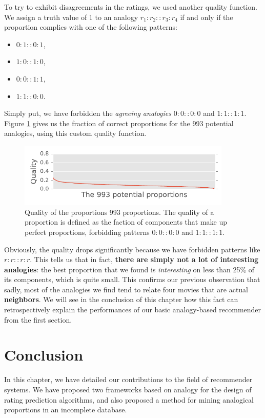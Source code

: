 To try to exhibit disagreements in the ratings, we used another quality
function. We assign a truth value of $1$ to an analogy $r_1:r_2::r_3:r_4$ if
and only if the proportion complies with one of the following patterns:
\begin{itemize}
  \item $0:1::0:1$,
  \item $1:0::1:0$,
  \item $0:0::1:1$,
  \item $1:1::0:0$.
\end{itemize}
Simply put, we have forbidden the \textit{agreeing analogies} $0:0::0:0$ and
$1:1::1:1$. Figure \ref{FIG:quality_proportions_different_ab_cd} gives us the
fraction of correct proportions for the 993 potential analogies, using this
custom quality function.
\begin{figure}[!h]
\centering
  \includegraphics[width=4in]{figures/quality_of_proportions_different.pdf}
  \caption{Quality of the proportions 993 proportions. The quality of a
  proportion is defined as the faction of components that make up perfect
  proportions, forbidding patterns $0:0::0:0$ and $1:1::1:1$.}
\label{FIG:quality_proportions_different_ab_cd}
\end{figure}
Obviously, the quality drops significantly because we have forbidden patterns
like $r:r::r:r$. This tells us that in fact, \textbf{there are simply not a lot of
interesting analogies}: the best proportion that we found is
\textit{interesting} on less than 25\% of its components, which is quite small.
This confirms our previous observation that sadly, most of the analogies we
find tend to relate four movies that are actual \textbf{neighbors}. We will see
in the conclusion of this chapter how this fact can retrospectively explain the
performances of our basic analogy-based recommender from the first section.

\section*{Conclusion}

In this chapter, we have detailed our contributions to the field of recommender
systems. We have proposed two frameworks based on analogy for the design of
rating prediction algorithms, and also proposed a method for mining analogical
proportions in an incomplete database.


